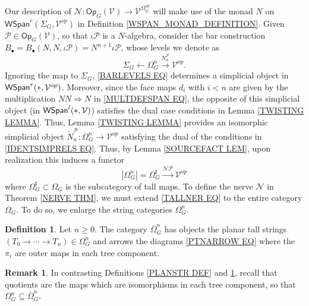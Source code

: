 \documentclass[a4paper,10pt
,draft
]{article}%
\numberwithin{equation}{section}
\numberwithin{figure}{section}
\theoremstyle{definition} %
\newtheorem{definition}[equation]{Definition}%
\newtheorem{remark}[equation]{Remark}%
\newcommand{\1}{\ensuremath{\mathbbm 1}}%
\begin{document}
Our description of 
$\mathcal{N} \colon \mathsf{Op}_G(\mathcal{V})
\to 
\mathcal{V}^{\Omega_G^{op}}$
will make use of the monad 
$N$ on
$\mathsf{WSpan}^r(\Sigma_G,\mathcal{V}^{op})$
in Definition \ref{WSPAN_MONAD_DEFINITION}.
Given $\mathcal{P} \in \mathsf{Op}_G(\mathcal{V})$,
so that $\iota \mathcal{P}$ is a $N$-algebra,
consider the bar construction
$B_{\bullet} = 
B_{\bullet}(N,N,\iota \mathcal{P})
= N^{n+1} \iota \mathcal{P}$,
whose levels we denote as
\begin{equation}\label{BARLEVELS EQ}
	\Sigma_G \leftarrow 
	\Omega_G^n \xrightarrow{N_n^{\mathcal{P}}}
	\mathcal{V}^{op}.
\end{equation}
Ignoring the map to $\Sigma_G$,
\eqref{BARLEVELS EQ} determines 
a simplicial object in 
$\mathsf{WSpan}^r(\**,\mathcal{V}^{op})$.
Moreover, since the face maps $d_i$ with $i < n$
are given by the multiplication
$NN \Rightarrow N$ in \eqref{MULTDEFSPAN EQ},
the opposite of this simplicial object 
(in $\mathsf{WSpan}^l(\**,\mathcal{V})$)
satisfies the dual case conditions in 
Lemma \ref{TWISTING LEMMA}.
Thus, Lemma \ref{TWISTING LEMMA}
provides an isomorphic simplicial object
$\tilde{N}_n^{\mathcal{P}} \colon 
\Omega_G^n \to \mathcal{V}^{op}$
satisfying the dual of the conditions in
\eqref{IDENTSIMPRELS EQ}.
Thus, by Lemma \ref{SOURCEFACT LEM},
upon realization this induces a functor
\begin{equation}\label{TALLNER EQ}
	|\Omega^n_G| = \Omega_G^{\mathsf{t}}
	\xrightarrow{\mathcal{N} \mathcal{P}}
	\mathcal{V}^{op}
\end{equation}
where $\Omega_G^{\mathsf{t}} \subset \Omega_G$
is the subcategory of tall maps.
To define the nerve $\mathcal{N}$ in Theorem \ref{NERVE THM},
we must extend \eqref{TALLNER EQ}
to the entire category $\Omega_G$.
To do so, we enlarge the string categories
$\Omega_G^n$.

\begin{definition}\label{PLANSTRO DEF}
	Let $n \geq 0$. The category $\overline{\Omega}^n_G$
	has objects the planar tall strings
	$(T_0 \to \cdots \to T_n) \in \Omega^n_G$
	and arrows the diagrams \eqref{PTNARROW EQ}
	where the $\pi_i$ are outer maps
	in each tree component.
\end{definition}

\begin{remark}
	In contrasting Definitions 
	\ref{PLANSTR DEF} and \ref{PLANSTRO DEF},
	recall that quotients are the maps
	which are isomorphisms in each tree component, so that
	$\Omega^n_G \subseteq \overline{\Omega}^n_G$.
\end{remark}
\end{document}
